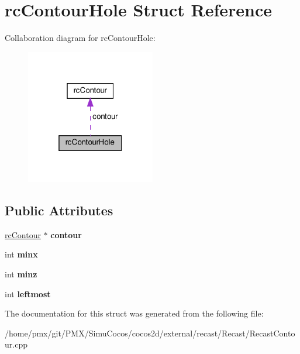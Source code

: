 \hypertarget{structrcContourHole}{}\section{rc\+Contour\+Hole Struct Reference}
\label{structrcContourHole}


Collaboration diagram for rc\+Contour\+Hole\+:
\nopagebreak
\begin{figure}[H]
\begin{center}
\leavevmode
\includegraphics[width=160pt]{structrcContourHole__coll__graph}
\end{center}
\end{figure}
\subsection*{Public Attributes}
\begin{DoxyCompactItemize}
\item 
\mbox{\label{structrcContourHole_a50ecff3495d1d371e5de0d3cdd32976c}} 
\hyperlink{structrcContour}{rc\+Contour} $\ast$ {\bfseries contour}
\item 
\mbox{\label{structrcContourHole_ab83982af11e1649becfdf57766fe45ee}} 
int {\bfseries minx}
\item 
\mbox{\label{structrcContourHole_a6638d0ce2b7972c1a6e795a99fea5504}} 
int {\bfseries minz}
\item 
\mbox{\label{structrcContourHole_a9fb0f2717007dddc37156feca8b00cf2}} 
int {\bfseries leftmost}
\end{DoxyCompactItemize}


The documentation for this struct was generated from the following file\+:\begin{DoxyCompactItemize}
\item 
/home/pmx/git/\+P\+M\+X/\+Simu\+Cocos/cocos2d/external/recast/\+Recast/Recast\+Contour.\+cpp\end{DoxyCompactItemize}
